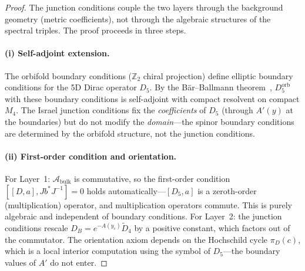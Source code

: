 \begin{proof}
The junction conditions couple the two layers through the background geometry (metric coefficients), not through the algebraic structures of the spectral triples. The proof proceeds in three steps.

\paragraph{(i) Self-adjoint extension.}
The orbifold boundary conditions ($\mathbb{Z}_2$ chiral projection) define elliptic boundary conditions for the 5D Dirac operator $D_5$. By the B\"ar--Ballmann theorem~\cite{ch4:bar2012}, $D_5^{\mathrm{orb}}$ with these boundary conditions is self-adjoint with compact resolvent on compact $M_4$. The Israel junction conditions fix the \emph{coefficients} of $D_5$ (through $A'(y)$ at the boundaries) but do not modify the \emph{domain}---the spinor boundary conditions are determined by the orbifold structure, not the junction conditions.

\paragraph{(ii) First-order condition and orientation.}
For Layer~1: $\mathcal{A}_{\mathrm{bulk}}$ is commutative, so the first-order condition $[[D,a],Jb^*J^{-1}] = 0$ holds automatically---$[D_5, a]$ is a zeroth-order (multiplication) operator, and multiplication operators commute. This is purely algebraic and independent of boundary conditions. For Layer~2: the junction conditions rescale $D_B = e^{-A(y_c)} \widetilde{D}_4$ by a positive constant, which factors out of the commutator. The orientation axiom depends on the Hochschild cycle $\pi_D(c)$, which is a local interior computation using the symbol of $D_5$---the boundary values of $A'$ do not enter.


\end{proof}
